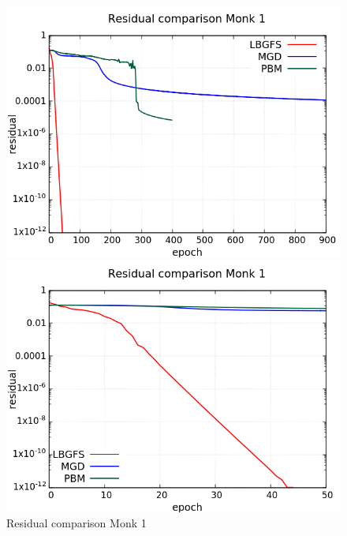 \begin{figure}[H]
	\centering
	\begin{minipage}[t]{0.5\linewidth}
		\includegraphics[width=\linewidth]{data/Comparison/Monk1/Monk1_R_Comparison_log_standard.png}
	\end{minipage}%
	\begin{minipage}[t]{0.5\linewidth}
		\includegraphics[width=\linewidth]{data/Comparison/Monk1/Monk1_R_Comparison_log_zoom.png}
	\end{minipage}
	\caption{Residual comparison Monk 1}
	\label{R-Monk1}
\end{figure}

